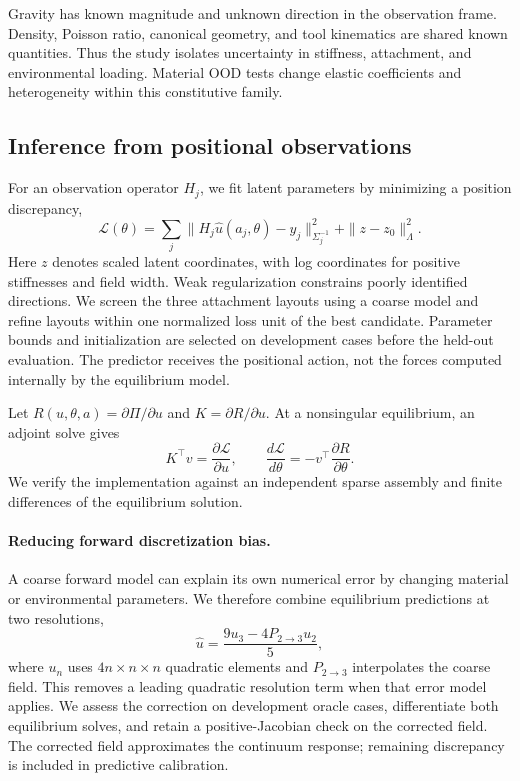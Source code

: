 \documentclass[10pt,twocolumn,letterpaper]{article}
\begin{document}
Gravity has known magnitude and unknown direction in the observation frame. Density, Poisson ratio, canonical geometry, and tool kinematics are shared known quantities. Thus the study isolates uncertainty in stiffness, attachment, and environmental loading. Material OOD tests change elastic coefficients and heterogeneity within this constitutive family.

\subsection{Inference from positional observations}
For an observation operator $H_j$, we fit latent parameters by minimizing a position discrepancy,
\begin{equation}
 \mathcal L(\theta)=\sum_j\|H_j \hat u(a_j,\theta)-y_j\|^2_{\Sigma_j^{-1}}+\|z-z_0\|^2_{\Lambda}.
\end{equation}
Here $z$ denotes scaled latent coordinates, with log coordinates for positive stiffnesses and field width. Weak regularization constrains poorly identified directions. We screen the three attachment layouts using a coarse model and refine layouts within one normalized loss unit of the best candidate. Parameter bounds and initialization are selected on development cases before the held-out evaluation. The predictor receives the positional action, not the forces computed internally by the equilibrium model.

Let $R(u,\theta,a)=\partial\Pi/\partial u$ and $K=\partial R/\partial u$. At a nonsingular equilibrium, an adjoint solve gives
\begin{equation}
 K^\top v=\frac{\partial\mathcal L}{\partial u},\qquad
 \frac{d\mathcal L}{d\theta}=-v^\top\frac{\partial R}{\partial\theta}.
\end{equation}
We verify the implementation against an independent sparse assembly and finite differences of the equilibrium solution.

\paragraph{Reducing forward discretization bias.}
A coarse forward model can explain its own numerical error by changing material or environmental parameters. We therefore combine equilibrium predictions at two resolutions,
\begin{equation}
 \hat u=\frac{9u_3-4P_{2\to3}u_2}{5},
\end{equation}
where $u_n$ uses $4n\times n\times n$ quadratic elements and $P_{2\to3}$ interpolates the coarse field. This removes a leading quadratic resolution term when that error model applies. We assess the correction on development oracle cases, differentiate both equilibrium solves, and retain a positive-Jacobian check on the corrected field. The corrected field approximates the continuum response; remaining discrepancy is included in predictive calibration.
\end{document}
